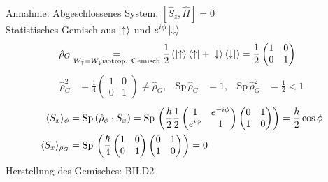 	Annahme: Abgeschlossenes System, $[\hat{S}_z, \hat{H}] = 0$ \\
	Statistisches Gemisch aus $\ket{\uparrow}$ und $e^{i\phi} \ket{\downarrow}$ 
		\begin{align*}
			\hat{\rho}_G &\underset{W_\uparrow = W_\downarrow \text{isotrop. Gemisch}}{=} 
			\frac{1}{2} 
			\left(
				\ket{\uparrow} \bra{\uparrow} + \ket{\downarrow} \bra{\downarrow}
			\right) = 
			\frac{1}{2}
			\begin{pmatrix}
				1 & 0 \\
				0 & 1
			\end{pmatrix}
		\end{align*}
		\begin{align*}
			\hat{\rho}^2_G &= \frac{1}{4} 
			\begin{pmatrix}
				1 & 0 \\
				0 & 1 
			\end{pmatrix} \neq \hat{\rho}_G,&
			\mathrm{Sp}\, \hat{\rho}_G &= 1,&
			\mathrm{Sp}\, \hat{\rho}^2_G &= \frac{1}{2} <1 
		\end{align*}
		\begin{align*}
			\langle {S_x} \rangle_\phi &= \mathrm{Sp}\, (\hat{\rho}_\phi \cdot S_x) =
			\mathrm{Sp}\, \left(
				\frac{\hbar}{2} \frac{1}{2} 
				\begin{pmatrix}
					1 & e^{-i\phi} \\
					e^{i \phi} & 1 
				\end{pmatrix}
				\begin{pmatrix}
				0 & 1 \\
				1 & 0 
				\end{pmatrix}
			\right) = \frac{\hbar}{2} \cos \phi \\
			\langle {S_x} \rangle_{\rho_G} &= \mathrm{Sp}\,
			\left(
				\frac{\hbar}{4}
				\begin{pmatrix}
				1 & 0 \\
				0 & 1 
				\end{pmatrix}
				\begin{pmatrix}
				0 & 1 \\
				1 & 0 
				\end{pmatrix}
			\right) = 0
		\end{align*}
	Herstellung des Gemisches:
	BILD2
	

